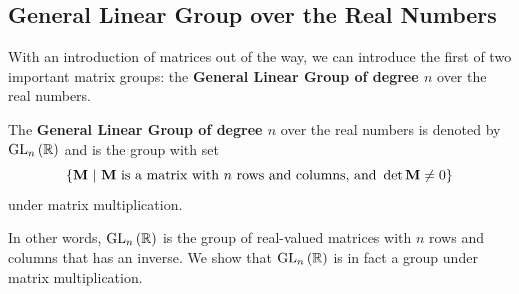 \subsection{General Linear Group over the Real Numbers}
With an introduction of matrices out of the way, we can introduce the first of two important matrix groups: the \textbf{General Linear Group of degree $n$} over the real numbers.
\begin{definition}
    The \textbf{General Linear Group of degree $n$} over the real numbers is denoted by $\mathrm{GL}_{n}\left(\mathbb{R}\right)$ and is the group with set
    \[
        \left\{\textbf{M} \ | \ \text{\textbf{M} is a matrix with } n \text{ rows and columns, and } \det \textbf{M} \neq 0\right\}
    \]
    under matrix multiplication.
\end{definition}
In other words, $\mathrm{GL}_{n}\left(\mathbb{R}\right)$ is the group of real-valued matrices with $n$ rows and columns that has an inverse. We show that $\mathrm{GL}_{n}\left(\mathbb{R}\right)$ is in fact a group under matrix multiplication.
